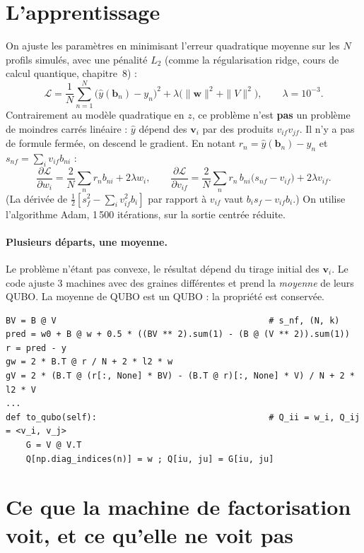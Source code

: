 \section{L'apprentissage}
On ajuste les paramètres en minimisant l'erreur quadratique moyenne sur les $N$ profils simulés, avec une pénalité $L_2$ (comme la régularisation ridge, cours de calcul quantique, chapitre~8) :
\[ \mathcal L=\frac1N\sum_{n=1}^N\big(\hat y(\mathbf b_n)-y_n\big)^2+\lambda\big(\|\mathbf w\|^2+\|V\|^2\big),\qquad\lambda=10^{-3}. \]
Contrairement au modèle quadratique en $z$, ce problème n'est \textbf{pas} un problème de moindres carrés linéaire : $\hat y$ dépend des $\mathbf v_i$ par des produits $v_{if}v_{jf}$. Il n'y a pas de formule fermée, on descend le gradient. En notant $r_n=\hat y(\mathbf b_n)-y_n$ et $s_{nf}=\sum_iv_{if}b_{ni}$ :
\[ \frac{\partial\mathcal L}{\partial w_i}=\frac2N\sum_nr_nb_{ni}+2\lambda w_i,\qquad \frac{\partial\mathcal L}{\partial v_{if}}=\frac2N\sum_nr_n\,b_{ni}\big(s_{nf}-v_{if}\big)+2\lambda v_{if}. \]
(La dérivée de $\frac12[s_f^2-\sum_iv_{if}^2b_i]$ par rapport à $v_{if}$ vaut $b_is_f-v_{if}b_i$.) On utilise l'algorithme Adam, 1\,500 itérations, sur la sortie centrée réduite.

\paragraph{Plusieurs départs, une moyenne.} Le problème n'étant pas convexe, le résultat dépend du tirage initial des $\mathbf v_i$. Le code ajuste 3 machines avec des graines différentes et prend la \emph{moyenne} de leurs QUBO. La moyenne de QUBO est un QUBO : la propriété est conservée.

\begin{codebox}
\begin{lstlisting}
BV = B @ V                                          # s_nf, (N, k)
pred = w0 + B @ w + 0.5 * ((BV ** 2).sum(1) - (B @ (V ** 2)).sum(1))
r = pred - y
gw = 2 * B.T @ r / N + 2 * l2 * w
gV = 2 * (B.T @ (r[:, None] * BV) - (B.T @ r)[:, None] * V) / N + 2 * l2 * V
...
def to_qubo(self):                                  # Q_ii = w_i, Q_ij = <v_i, v_j>
    G = V @ V.T
    Q[np.diag_indices(n)] = w ; Q[iu, ju] = G[iu, ju]
\end{lstlisting}
\end{codebox}

\section{Ce que la machine de factorisation voit, et ce qu'elle ne voit pas}
